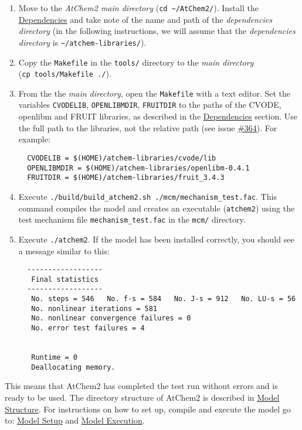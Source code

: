 \begin{enumerate}
\item Move to the \emph{AtChem2 main directory} (\texttt{cd\
    \textasciitilde{}/AtChem2/}). Install the
  \hyperref[sec:dependencies]{Dependencies} and take note of the name
  and path of the \emph{dependencies directory} (in the following
  instructions, we will assume that the \emph{dependencies directory}
  is \texttt{\textasciitilde{}/atchem-libraries/}).
\item Copy the \texttt{Makefile} in the \texttt{tools/} directory to
  the \emph{main directory} (\texttt{cp\ tools/Makefile\ ./}).
\item From the the \emph{main directory}, open the \texttt{Makefile}
  with a text editor. Set the variables \texttt{CVODELIB},
  \texttt{OPENLIBMDIR}, \texttt{FRUITDIR} to the paths of the CVODE,
  openlibm and FRUIT libraries, as described in the
  \hyperref[sec:dependencies]{Dependencies} section. Use the full path
  to the libraries, not the relative path (see issue
  \href{https://github.com/AtChem/AtChem2/issues/364}{\#364}). For
  example:
  \begin{verbatim}
  CVODELIB = $(HOME)/atchem-libraries/cvode/lib
  OPENLIBMDIR = $(HOME)/atchem-libraries/openlibm-0.4.1
  FRUITDIR = $(HOME)/atchem-libraries/fruit_3.4.3
  \end{verbatim}
\item Execute \texttt{./build/build\_atchem2.sh\
    ./mcm/mechanism\_test.fac}. This command compiles the model and
  creates an executable (\texttt{atchem2}) using the test mechanism
  file \texttt{mechanism\_test.fac} in the \texttt{mcm/} directory.
\item Execute \texttt{./atchem2}. If the model has been installed
  correctly, you should see a message similar to this:
  \begin{verbatim}
  ------------------
   Final statistics
  ------------------
   No. steps = 546   No. f-s = 584   No. J-s = 912   No. LU-s = 56
   No. nonlinear iterations = 581
   No. nonlinear convergence failures = 0
   No. error test failures = 4


   Runtime = 0
   Deallocating memory.
  \end{verbatim}
\end{enumerate}

This means that AtChem2 has completed the test run without errors and
is ready to be used. The directory structure of AtChem2 is described
in \hyperref[sec:structure]{Model Structure}. For instructions on how
to set up, compile and execute the model go to:
\hyperref[ch:setup]{Model Setup} and \hyperref[ch:execution]{Model
  Execution}.


